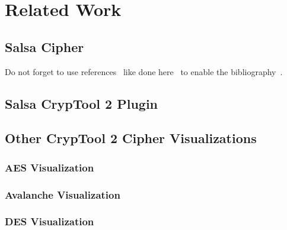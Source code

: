 \chapter{Related Work}
\label{sec:relatedWork}
\section{Salsa Cipher}
\label{sec:salsaCipher}

Do not forget to use references~\cite{Hanser2019energy} like done here~\cite{Hofmann2019dependentVectors} to enable the bibliography~\cite{Jung2017tumble, Sagrista2019GaiaSky, Sdeo2018fullerene, Zheng2019equivalence}.


\section{Salsa CrypTool 2 Plugin}
\label{sec:salsaCT2Plugin}

\section{Other CrypTool 2 Cipher Visualizations}
\label{sec:otherCT2CipherVisualizations}

\subsection{AES Visualization}
\label{sec:aesVisualization}

\subsection{Avalanche Visualization}
\label{sec:avalancheVisualization}

\subsection{DES Visualization}
\label{sec:desVisualization}
